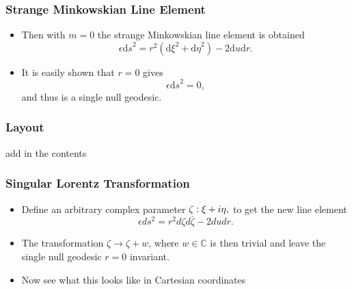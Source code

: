 \documentclass[10pt,a4paper]{beamer}
\begin{document}
\begin{frame}
\frametitle{Strange Minkowskian Line Element}
\begin{itemize}
\item<1->{Then with $m = 0$ the strange Minkowskian line element is obtained $$\epsilon {\mathrm{d}s}^2 = r^2 ({\mathrm{d}\xi}^2 + {\mathrm{d}\eta}^2) - 2 {\mathrm{d}u}{\mathrm{d}r}.$$}
\item<2->{It is easily shown that $r = 0$ gives $$\epsilon {\mathrm{d}s}^2 = 0,$$ and thus is a single null geodesic.}
\end{itemize}
\end{frame}

\begin{frame}
\frametitle{Layout}
add in the contents
\end{frame}


\begin{frame}
\frametitle{Singular Lorentz Transformation}
\begin{itemize}
\item<1->{Define an arbitrary complex parameter $\zeta \vcentcolon \xi + i \eta,$ to get the new line element $$\epsilon {ds^2} = r^2 {d\zeta}{d\bar{\zeta}} - 2 {du}{dr}.$$}
\item<2->{The transformation $\zeta \rightarrow \zeta + w$, where $w \in \mathbb{C}$ is then trivial and leave the single null geodesic $r = 0$ invariant.}
\item<3->{Now see what this looks like in Cartesian coordinates}
\end{itemize}


\end{frame}
\end{document}
